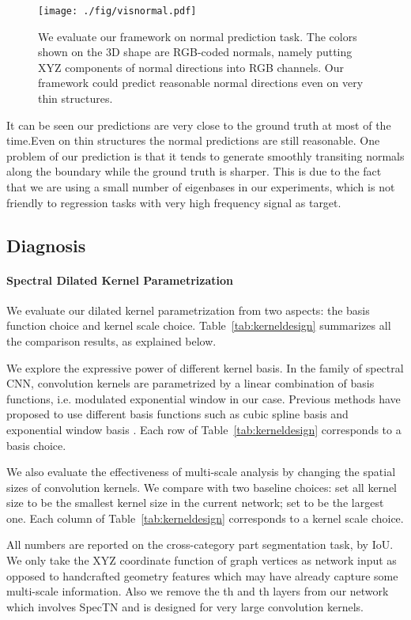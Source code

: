 \documentclass[10pt,twocolumn,letterpaper]{article}
\newcommand{\myparaly}{\vspace*{-5pt}\paragraph}
\begin{document}
\begin{figure}
 \centering
 \texttt{[image: ./fig/visnormal.pdf]}
 \caption{We evaluate our framework on normal prediction task. The colors shown on the 3D shape are RGB-coded normals, namely putting XYZ components of normal directions into RGB channels. Our framework could predict reasonable normal directions even on very thin structures.}
 \label{fig:normpred}
\end{figure}

It can be seen our predictions are very close to the ground truth at most of the time.Even on thin structures the normal predictions are still reasonable. One problem of our prediction is that it tends to generate smoothly transiting normals along the boundary while the ground truth is sharper. This is due to the fact that we are using a small number of eigenbases in our experiments, which is not friendly to regression tasks with very high frequency signal as target.

\subsection{Diagnosis}
\myparaly{Spectral Dilated Kernel Parametrization}
 We evaluate our dilated kernel parametrization from two aspects: the basis function choice and kernel scale choice. Table~\ref{tab:kerneldesign} summarizes all the comparison results, as explained below.
 
We explore the expressive power of different kernel basis. In the family of spectral CNN, convolution kernels are parametrized by a linear combination of basis functions, i.e. modulated exponential window in our case. Previous methods have proposed to use different basis functions such as cubic spline basis \cite{bruna2013spectral} and exponential window basis \cite{boscaini2016learning}. Each row of Table~\ref{tab:kerneldesign} corresponds to a basis choice.
 
We also evaluate the effectiveness of multi-scale analysis by changing the spatial sizes of convolution kernels. We compare with two baseline choices: set all kernel size to be the smallest kernel size in the current network; set to be the largest one. Each column of Table~\ref{tab:kerneldesign} corresponds to a kernel scale choice.
 
All numbers are reported on the cross-category part segmentation task, by IoU. We only take the XYZ coordinate function of graph vertices as network input as opposed to handcrafted geometry features which may have already capture some multi-scale information. Also we remove the th and th layers from our network which involves SpecTN and is designed for very large convolution kernels. 
\end{document}
